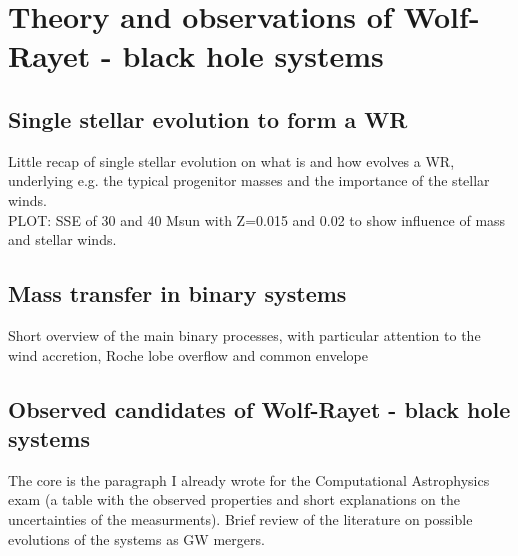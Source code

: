 \documentclass[a4paper,titlepage]{book}     	%
\begin{document}
\chapter{Theory and observations of Wolf-Rayet - black hole systems}
\section{Single stellar evolution to form a WR}
Little recap of single stellar evolution on what is and how evolves a WR, underlying e.g. the typical progenitor masses and the importance of the stellar winds.\\


PLOT: SSE of 30 and 40 Msun with Z=0.015 and 0.02 to show influence of mass and stellar winds.

\section{Mass transfer in binary systems}
Short overview of the main binary processes, with particular attention to the wind accretion, Roche lobe overflow and common envelope


\section{Observed candidates of Wolf-Rayet - black hole systems}\label{sec:WRBHobserved}
The core is the paragraph I already wrote for the Computational Astrophysics exam (a table with the observed properties and short explanations on the uncertainties of the measurments). Brief review of the literature on possible evolutions of the systems as GW mergers.\\
\end{document}
